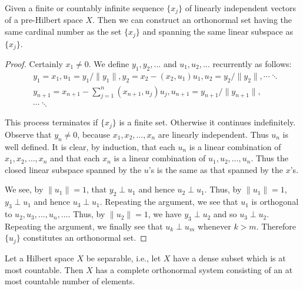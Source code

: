 \label{sec:III.5}

\begin{theoremn} Given a finite or countably infinite sequence $\{x_{j}\}$ of linearly independent vectors of a pre-Hilbert space $X$. Then we can construct an orthonormal set having the same cardinal number as the set $\{x_{j}\}$ and spanning the same linear subspace as $\{x_{j}\}$.

\end{theoremn}
\begin{proof}
 Certainly $x_{1} \neq 0$. We define $y_{1}, y_{2}, \ldots$ and $u_{1}, u_{2}, \ldots$ recurrently as follows: 
\[
\begin{aligned}
&y_{1} = x_{1},  u_{1} = y_{1}/\|y_{1}\|, y_{2} = x_{2} - (x_{2}, u_{1})u_{1},  u_{2} = y_{2}/\|y_{2}\|, \cdots   \ddots \\
&y_{n+1} = x_{n+1} - \sum\limits_{j=1}^{n}(x_{n+1}, u_{j})u_{j},  u_{n+1} = y_{n+1}/\|y_{n+1}\|, \\
&\cdots   \ddots
\end{aligned}
\]

This process terminates if $\{x_j\}$ is a finite set. Otherwise it continues indefinitely. Observe that $y_n \neq 0$, because $x_1, x_2, \ldots, x_n$ are linearly independent. Thus $u_n$ is well defined. It is clear, by induction, that each $u_n$ is a linear combination of $x_1, x_2, \ldots, x_n$ and that each $x_n$ is a linear combination of $u_1, u_2, \ldots, u_n$. Thus the closed linear subspace spanned by the $u$'s is the same as that spanned by the $x$'s. 


We see, by $\|u_{1}\|=1$, that $y_{2}\perp u_{1}$ and hence $u_{2}\perp u_{1}$. Thus, by $\|u_{1}\|=1$, $y_{3}\perp u_{1}$ and hence $u_{3}\perp u_{1}$. Repeating the argument, we see that $u_{1}$ is orthogonal to $u_{2}, u_{3}, \ldots, u_{n}, \ldots$. Thus, by $\|u_{2}\|=1$, we have $y_{3}\perp u_{2}$ and so $u_{3}\perp u_{2}$. Repeating the argument, we finally see that $u_{k}\perp u_{m}$ whenever $k>m$. Therefore $\{u_{j}\}$ constitutes an orthonormal set.
\end{proof}

\begin{corollaryu} Let a Hilbert space $X$ be separable, i.e., let $X$ have a dense subset which is at most countable. Then $X$ has a complete orthonormal system consisting of an at most countable number of elements. 
\end{corollaryu}

